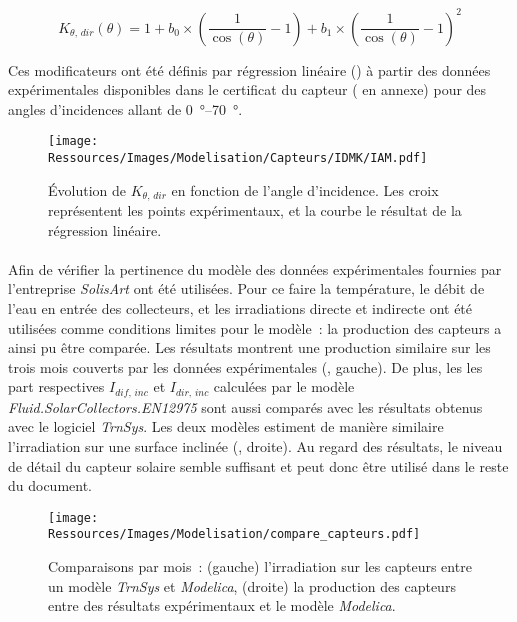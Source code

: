 \begin{equation}\label{eq:iam_dir_plan_model}
    K_{\theta,\,dir} (\theta) = 1 + b_{0} \times \left(\frac{1}{\cos(\theta)} - 1\right)
                                  + b_{1} \times \left(\frac{1}{\cos(\theta)} - 1\right)^{2}
\end{equation}

Ces modificateurs ont été définis par régression linéaire () à partir des données
expérimentales disponibles dans le certificat du capteur ( en annexe)
pour des angles d’incidences allant de \SIrange{0}{70}{\degree}.

\begin{figure}
    \centering
    \texttt{[image: Ressources/Images/Modelisation/Capteurs/IDMK/IAM.pdf]}
    \caption[ pour le rayonnement direct]
             {Évolution de $K_{\theta,\,dir}$ en fonction de l’angle d’incidence.
              Les croix représentent les points expérimentaux, et la courbe le résultat
              de la régression linéaire.}
    \label{fig:IAM_idmk}
\end{figure}

\paragraph{} %
Afin de vérifier la pertinence du modèle des données expérimentales fournies par
l’entreprise \textit{SolisArt} ont été utilisées. Pour ce faire la température, le débit
de l’eau en entrée des collecteurs, et les irradiations directe et indirecte ont été
utilisées comme conditions limites pour le modèle~: la production des capteurs a ainsi pu
être comparée. Les résultats montrent une production similaire sur les trois mois couverts
par les données expérimentales (, gauche). De plus, les les
part respectives $I_{dif,\,inc}$ et $I_{dir,\,inc}$ calculées par le modèle
\textit{Fluid.SolarCollectors.EN12975} sont aussi comparés avec les résultats obtenus avec
le logiciel \textit{TrnSys}. Les deux modèles estiment de manière similaire l’irradiation
sur une surface inclinée (, droite). Au regard des résultats,
le niveau de détail du capteur solaire semble suffisant et peut donc être utilisé dans le
reste du document.

\begin{figure}
    \centering
    \texttt{[image: Ressources/Images/Modelisation/compare\_capteurs.pdf]}
    \caption[Comparaisons de l’irradiation entre \textit{TrnSys}, \textit{Modelica}]
             {Comparaisons par mois~: (gauche) l’irradiation sur les capteurs entre un modèle
             \textit{TrnSys} et \textit{Modelica}, (droite) la production des capteurs entre des résultats
             expérimentaux et le modèle \textit{Modelica}.}
    \label{fig:compare_capteurs}
\end{figure}
\FloatBarrier


